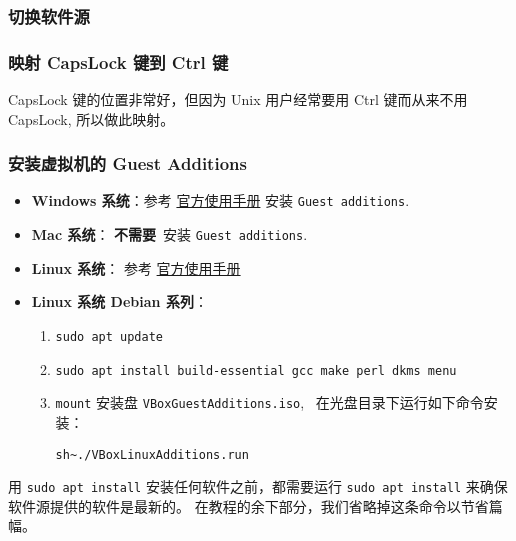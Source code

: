 \documentclass[
    11pt,
    base=hide,
    cite=authoryear,
    device=phone,
    lang=cn,
    mode=simple,
    result=answer,
    toc=onecol,
]{elegantbook_sierxue}
\begin{document}
\subsubsection{切换软件源}%
\label{ssub:vm-source}

\subsubsection{映射 CapsLock 键到 Ctrl 键}%
\label{ssub:vm-caps-ctrl}

CapsLock 键的位置非常好，但因为 Unix 用户经常要用 Ctrl 键而从来不用 CapsLock,
所以做此映射。

\subsubsection{安装虚拟机的 Guest Additions}%
\label{ssub:vbox-guest-additions}
\begin{itemize}
    \item \textbf{Windows 系统}：参考
        \href{https://www.virtualbox.org/manual/UserManual.html#additions-windows}{官方使用手册}
        安装 \lstinline{Guest additions}.
    \item \textbf{Mac 系统}： \textbf{不需要}~安装
        \lstinline{Guest additions}.
    \item \textbf{Linux 系统}： 参考
        \href{https://www.virtualbox.org/manual/UserManual.html#additions-linux}{官方使用手册}
    \item \textbf{Linux 系统 Debian 系列}：
        \begin{enumerate}
            \item \lstinline{sudo apt update}
            \item \lstinline{sudo apt install build-essential gcc make perl dkms menu}
            \item \lstinline{mount} 安装盘
                \lstinline{VBoxGuestAdditions.iso},~%
                在光盘目录下运行如下命令安装：
                 \begin{center}\label{center:vm-guest-additions}
                     \lstinline{sh~./VBoxLinuxAdditions.run}
                 \end{center}
        \end{enumerate}
\end{itemize}
\begin{note}\label{note:ubuntu-update}
    用 \lstinline{sudo apt install} 安装任何软件之前，都需要运行
    \lstinline{sudo apt install} 来确保软件源提供的软件是最新的。
    在教程的余下部分，我们省略掉这条命令以节省篇幅。
\end{note}
\end{document}
